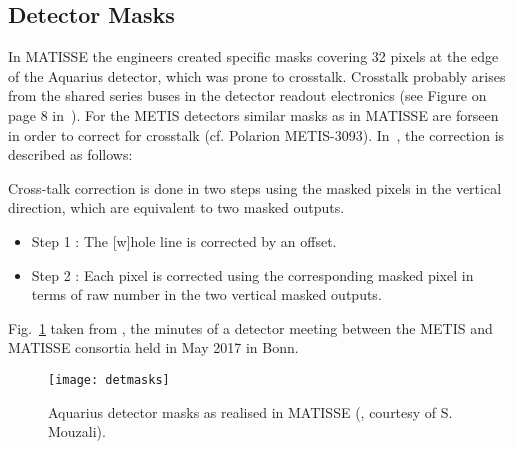 

\subsection{Detector Masks}\label{ssec:criticaldetetctormasks}

In MATISSE the engineers created specific masks covering 32 pixels at the edge of the Aquarius detector, which was prone to crosstalk.
Crosstalk probably arises from the shared series buses in the detector readout electronics (see Figure on page 8 in~\cite{matisse_minutes}).
For the METIS detectors similar masks as in MATISSE are forseen in order to correct for crosstalk (cf. Polarion METIS-3093).
In~\cite{matisse_minutes}, the correction is described as follows:

\begin{displayquote}
Cross-talk correction is done in two steps using the masked pixels in the vertical direction, which are equivalent to two masked outputs.
\begin{itemize}
    \item Step 1 : The [w]hole line is corrected by an offset.
    \item Step 2 : Each pixel is corrected using the corresponding masked pixel in terms of raw
number in the two vertical masked outputs.
\end{itemize}
\end{displayquote}

Fig.~\ref{fig:detmasks} taken from \cite{matisse_minutes}, the minutes
of a detector meeting between the METIS and MATISSE consortia held in
May 2017 in Bonn.
\begin{figure}[ht]
  \centering
  \texttt{[image: detmasks]}
  \caption[Aquarius detector masks]{Aquarius detector masks as
    realised in MATISSE (\cite{matisse_minutes}, courtesy of
    S. Mouzali).}
  \label{fig:detmasks}
\end{figure}



